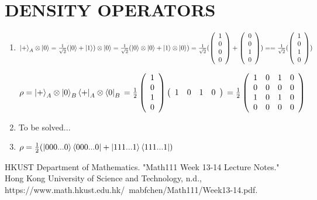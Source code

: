 \documentclass{article}
\begin{document}
\section*{DENSITY OPERATORS}
\begin{enumerate}
    \item $\ket{+}_A\otimes\ket{0}=\frac{1}{\sqrt{2}}(\ket{0}+\ket{1})\otimes\ket{0}=\frac{1}{\sqrt{2}}(\ket{0}\otimes\ket{0}+\ket{1}\otimes\ket{0})
    \\=\frac{1}{\sqrt{2}}(\left(\begin{array}{c}
        1\\0\\0\\0
    \end{array}\right)+\left(\begin{array}{c}
        0\\0\\1\\0
    \end{array}\right))
    \\==\frac{1}{\sqrt{2}}(\left(\begin{array}{c}
        1\\0\\1\\0
    \end{array}\right))
    $



    $\rho
    \\=\ket{+}_A\otimes\ket{0}_B\bra{+}_A\otimes\bra{0}_B
    \\=\frac{1}{2}\left(\begin{array}{c}
        1\\0\\1\\0
    \end{array}\right)\left(\begin{array}{cccc}
        1&0&1&0
    \end{array}\right)
    \\=\frac{1}{2}\left(
        \begin{array}{cccc}
            1&0&1&0\\0&0&0&0\\1&0&1&0\\0&0&0&0
        \end{array}
    \right)
    $
    \item To be solved...
    \item $\rho=\frac{1}{2}(\ket{000...0}\bra{000...0}+\ket{111...1}\bra{111...1})$
\end{enumerate}

\begin{thebibliography}{99}
    HKUST Department of Mathematics.
    "Math111 Week 13-14 Lecture Notes."
    Hong Kong University of Science and Technology, n.d.,
    https://www.math.hkust.edu.hk/~mabfchen/Math111/Week13-14.pdf.
\end{thebibliography}
\end{document}
